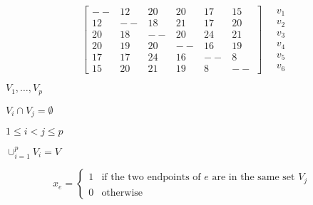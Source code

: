 {\newpage\clearpage
{}%
\begin{displaymath}
\left[ \begin{array}{rrrrrr} -- & 12 & 20 & 20 & 17 & 15 \\
                                12 & -- & 18 & 21 & 17 & 20 \\
                                20 & 18 & -- & 20 & 24 & 21 \\
                                20 & 19 & 20 & -- & 16 & 19 \\
                                17 & 17 & 24 & 16 & -- &  8 \\
                                15 & 20 & 21 & 19 &  8 & -- 
           \end{array}  \right]  \quad
    \left. \begin{array}{c} v_1 \\v_2 \\v_3 \\v_4 \\v_5 \\v_6 \end{array}
             \right.
\end{displaymath}%
\lthtmldisplayZ
\hfill\lthtmlcheckvsize\clearpage}

{\newpage\clearpage
{}%
$V_1,\ldots,V_p$%
\lthtmlinlinemathZ
\hfill\lthtmlcheckvsize\clearpage}

{\newpage\clearpage
{}%
$V_i \cap V_j = \emptyset$%
\lthtmlinlinemathZ
\hfill\lthtmlcheckvsize\clearpage}

{\newpage\clearpage
{}%
$1\leq i < j \leq p$%
\lthtmlinlinemathZ
\hfill\lthtmlcheckvsize\clearpage}

{\newpage\clearpage
{}%
$\cup_{i=1}^p V_i=V$%
\lthtmlinlinemathZ
\hfill\lthtmlcheckvsize\clearpage}

{\newpage\clearpage
{}%
\begin{displaymath}
  x_e = \left\{ \begin{array}{ll} 1 & \mbox{if the two endpoints of $e$                are in the same set $V_j$ }  \\0 & \mbox{otherwise}
        \end{array}  \right.
\end{displaymath}%
\lthtmldisplayZ
\hfill\lthtmlcheckvsize\clearpage}

